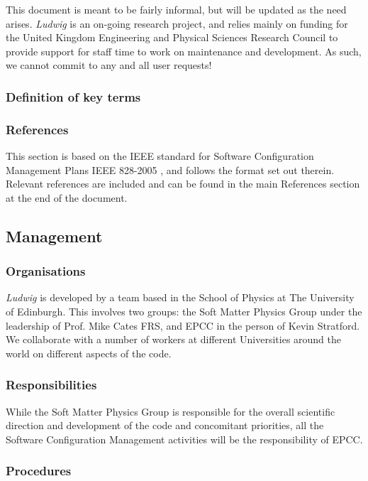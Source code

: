 \documentclass[11pt,twoside]{article}
\begin{document}
This document is meant to be fairly informal, but will be updated as
the need arises. 
\textit{Ludwig} is an on-going research project, and relies mainly
on funding for the United Kingdom Engineering and Physical Sciences Research
Council to provide support for staff time to work on maintenance and
development. As such, we cannot commit to any and all user requests!

\subsubsection{Definition of key terms}

\subsubsection{References}

This section is based on the IEEE standard for Software Configuration
Management Plans IEEE 828-2005 \cite{ieee-208}, and follows the format
set out therein.
Relevant references are included and can be found in the main References
section at the end of the document.

\subsection{Management}

\subsubsection{Organisations}

\textit{Ludwig} is developed by a team based in the School of Physics at
The University of Edinburgh. This involves two groups: the Soft Matter
Physics Group under the leadership of Prof. Mike Cates FRS, and EPCC in
the person of Kevin Stratford. We collaborate with a number of workers at
different Universities around the world on different aspects of the code.

\subsubsection{Responsibilities}

While the Soft Matter Physics Group is responsible for the overall
scientific direction and development of the code and concomitant
priorities, all
the Software Configuration Management activities will be the
responsibility of EPCC.

\subsubsection{Procedures}
\end{document}
